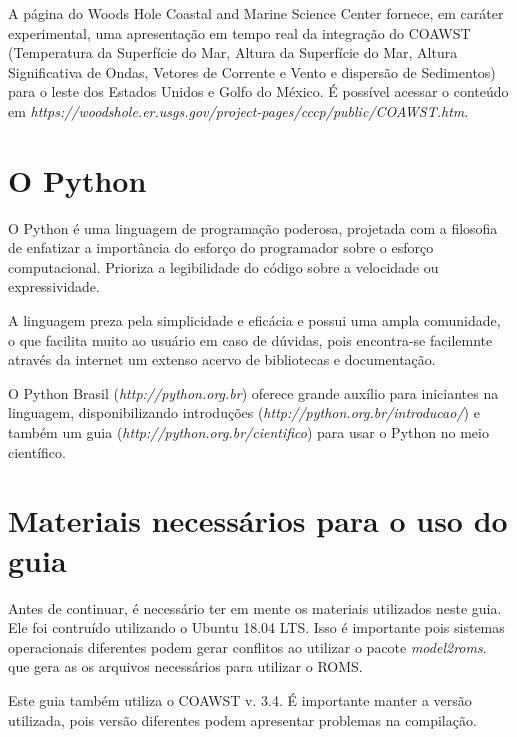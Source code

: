 \noindent A página do Woods Hole Coastal and Marine Science Center fornece, em caráter experimental, uma apresentação em tempo real da integração do COAWST (Temperatura da Superfície do Mar, Altura da Superfície do Mar, Altura Significativa de Ondas, Vetores de Corrente e Vento e dispersão de Sedimentos) para o leste dos Estados Unidos e Golfo do México. É possível acessar o conteúdo em \textcolor{bleu_cite}{\textit{https://woodshole.er.usgs.gov/project-pages/cccp/public/COAWST.htm}}.

\section{O Python}
\bigskip

\noindent O Python é uma linguagem de programação poderosa, projetada com a filosofia de enfatizar a importância do esforço do programador sobre o esforço computacional. Prioriza a legibilidade do código sobre a velocidade ou expressividade.
\bigskip

\noindent A linguagem preza pela simplicidade e eficácia e possui uma ampla comunidade, o que facilita muito ao usuário em caso de dúvidas, pois encontra-se facilemnte através da internet um extenso acervo de bibliotecas e documentação.
\bigskip

\noindent O Python Brasil (\textcolor{bleu_cite}{\textit{http://python.org.br}}) oferece grande auxílio para iniciantes na linguagem, disponibilizando introduções (\textcolor{bleu_cite}{\textit{http://python.org.br/introducao/}}) e também um guia (\textcolor{bleu_cite}{\textit{http://python.org.br/cientifico}}) para usar o Python no meio científico.



\section{Materiais necessários para o uso do guia}
\bigskip

\noindent Antes de continuar, é necessário ter em mente os materiais utilizados neste guia. Ele foi contruído  utilizando o Ubuntu 18.04 LTS. Isso é importante pois sistemas operacionais diferentes podem gerar conflitos ao utilizar o pacote \textit{model2roms}. que gera as os arquivos necessários para utilizar o ROMS.
\bigskip

\noindent Este guia também utiliza o COAWST v. 3.4. É importante manter a versão utilizada, pois versão diferentes podem apresentar problemas na compilação.
